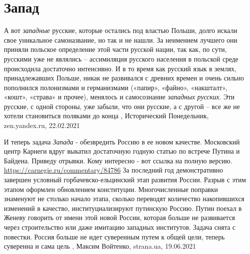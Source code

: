  
 
 
 
 
\chapter{Запад}

А вот \emph{западные} русские, которые остались под властью Польши, долго искали свое
уникальное самоназвание, но так и не нашли. За неимением лучшего они приняли
польское определение этой части русской нации, так как, по сути, русскими уже
не являлись – ассимиляция русского населения в польской среде происходила
достаточно интенсивно. И в то время как русский язык в землях, принадлежавших
Польше, никак не развивался с древних времен и очень сильно пополнился
полонизмами и германизмами («папир», «файно», «накшталт», «кошт», «страва» и
прочее), менялось и самосознание \emph{западных русских}. Эти русские, с одной
стороны, уже забыли, что они русские, а с другой – все же не хотели становиться
поляками до конца
, 
Исторический Понедельник, zen.yandex.ru, 22.02.2021 


И теперь задача \emph{Запада} - обезвредить Россию в ее новом качестве.  Московский
центр Карнеги вдруг выкатил достаточную годную статью по встрече Путина и
Байдена. Приведу отрывки. Кому интересно - вот ссылка на полную версию.
\url{https://carnegie.ru/commentary/84786} За последний год демонстративно
завершен условный горбачевско-ельцинский этап развития России. Разрыв с этим
этапом оформлен обновлением конституции. Многочисленные поправки знаменуют не
столько начало этапа, сколько переводят количество накопившихся изменений в
качество, институциализируют путинскую Россию. Путин поехал в Женеву говорить
от имени этой новой России, которая больше не развивается через строительство
или даже имитацию западных институтов. Задача снята с повестки. Россия больше
не идет суверенным путем к общей цели, теперь суверенна и сама цель
, 
Максим Войтенко, strana.ua, 19.06.2021


